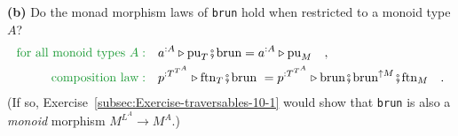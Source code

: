 \textbf{(b)} Do the monad morphism laws of \lstinline!brun! hold
when restricted to a monoid type $A$?
\begin{align*}
{\color{greenunder}\text{for all monoid types }A:}\quad & a^{:A}\triangleright\text{pu}_{T}\bef\text{brun}=a^{:A}\triangleright\text{pu}_{M}\quad,\\
{\color{greenunder}\text{composition law}:}\quad & p^{:T^{T^{A}}}\triangleright\text{ftn}_{T}\bef\text{brun }=p^{:T^{T^{A}}}\triangleright\text{brun}\bef\text{brun}^{\uparrow M}\bef\text{ftn}_{M}\quad.
\end{align*}
(If so, Exercise~\ref{subsec:Exercise-traversables-10-1} would show
that \lstinline!brun! is also a \emph{monoid} morphism $M^{L^{A}}\rightarrow M^{A}$.)
\begin{comment}
Failed attempts to verify the composition law:


\end{comment}
